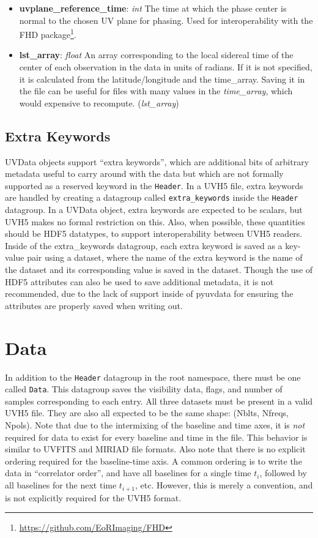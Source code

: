 \documentclass[11pt, oneside]{article}
\begin{document}
\begin{itemize}
\item \textbf{uvplane\_reference\_time}: \textit{int} The time at which the
  phase center is normal to the chosen UV plane for phasing. Used for
  interoperability with the FHD
  package\footnote{\url{https://github.com/EoRImaging/FHD}}.
\item \textbf{lst\_array}: \textit{float} An array corresponding to the local
  sidereal time of the center of each observation in the data in units of
  radians. If it is not specified, it is calculated from the latitude/longitude
  and the time\_array. Saving it in the file can be useful for files with many
  values in the \textit{time\_array}, which would expensive to
  recompute. (\textit{lst\_array})
\end{itemize}

\subsection{Extra Keywords}
\label{sec:extra_keywords}
UVData objects support ``extra keywords'', which are additional bits of
arbitrary metadata useful to carry around with the data but which are not
formally supported as a reserved keyword in the \verb+Header+. In a UVH5 file,
extra keywords are handled by creating a datagroup called \verb+extra_keywords+
inside the \verb+Header+ datagroup. In a UVData object, extra keywords are
expected to be scalars, but UVH5 makes no formal restriction on this. Also, when
possible, these quantities should be HDF5 datatypes, to support interoperability
between UVH5 readers. Inside of the extra\_keywords datagroup, each extra
keyword is saved as a key-value pair using a dataset, where the name of the
extra keyword is the name of the dataset and its corresponding value is saved in
the dataset. Though the use of HDF5 attributes can also be used to save
additional metadata, it is not recommended, due to the lack of support inside of
pyuvdata for ensuring the attributes are properly saved when writing out.


\section{Data}
\label{sec:data}
In addition to the \verb+Header+ datagroup in the root namespace, there must be
one called \verb+Data+. This datagroup saves the visibility data, flags, and
number of samples corresponding to each entry. All three datasets must be
present in a valid UVH5 file. They are also all expected to be the same shape:
(Nblts, Nfreqs, Npols). Note that due to the intermixing of the baseline and
time axes, it is \textit{not} required for data to exist for every baseline and
time in the file. This behavior is similar to UVFITS and MIRIAD file
formats. Also note that there is no explicit ordering required for the
baseline-time axis. A common ordering is to write the data in ``correlator
order'', and have all baselines for a single time $t_i$, followed by all
baselines for the next time $t_{i+1}$, etc. However, this is merely a
convention, and is not explicitly required for the UVH5 format.
\end{document}
